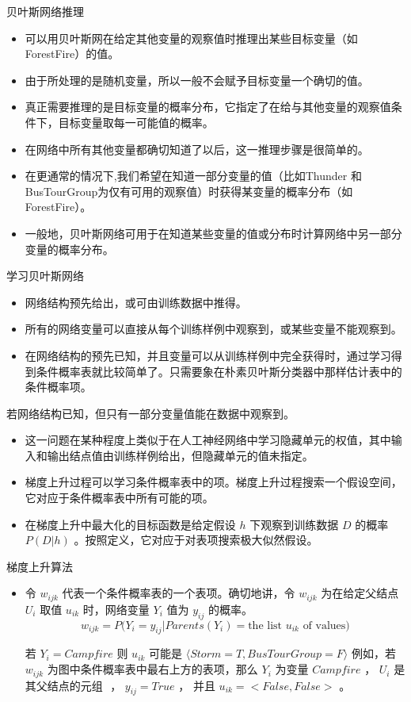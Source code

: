 \documentclass[presentation]{beamer}
\begin{document}
\begin{frame}[label={sec:orgf4b8337}]{贝叶斯网络推理}
\begin{itemize}
\item 可以用贝叶斯网在给定其他变量的观察值时推理出某些目标变量（如ForestFire）的值。
\item 由于所处理的是随机变量，所以一般不会赋予目标变量一个确切的值。
\item 真正需要推理的是目标变量的概率分布，它指定了在给与其他变量的观察值条件下，目标变量取每一可能值的概率。
\item 在网络中所有其他变量都确切知道了以后，这一推理步骤是很简单的。
\item 在更通常的情况下,我们希望在知道一部分变量的值（比如Thunder 和BusTourGroup为仅有可用的观察值）时获得某变量的概率分布（如ForestFire）。
\item 一般地，贝叶斯网络可用于在知道某些变量的值或分布时计算网络中另一部分变量的概率分布。
\end{itemize}
\end{frame}

\begin{frame}[label={sec:org0c68231}]{学习贝叶斯网络}
\begin{itemize}
\item 网络结构预先给出，或可由训练数据中推得。
\item 所有的网络变量可以直接从每个训练样例中观察到，或某些变量不能观察到。
\item 在网络结构的预先已知，并且变量可以从训练样例中完全获得时，通过学习得到条件概率表就比较简单了。只需要象在朴素贝叶斯分类器中那样估计表中的条件概率项。
\end{itemize}

若网络结构已知，但只有一部分变量值能在数据中观察到。
\begin{itemize}
\item 这一问题在某种程度上类似于在人工神经网络中学习隐藏单元的权值，其中输入和输出结点值由训练样例给出，但隐藏单元的值未指定。
\item 梯度上升过程可以学习条件概率表中的项。梯度上升过程搜索一个假设空间，它对应于条件概率表中所有可能的项。
\item 在梯度上升中最大化的目标函数是给定假设 \(h\) 下观察到训练数据 \(D\) 的概率 \(P(D|h)\) 。按照定义，它对应于对表项搜索极大似然假设。
\end{itemize}
\end{frame}

\begin{frame}[label={sec:org6c76063}]{梯度上升算法}
\begin{itemize}
\item 令 \(w_{ijk}\) 代表一个条件概率表的一个表项。确切地讲，令 \(w_{ijk}\)  为在给定父结点 \(U_i\) 取值 \(u_{ik}\) 时，网络变量 \(Y_i\) 值为 \(y_{ij}\) 的概率。
$$w_{ijk} = P(Y_i=y_{ij} | Parents(Y_i) = \mbox{the list $u_{ik}$ of values)}$$

若  \(Y_i = Campfire\) 则 \(u_{ik}\) 可能是 \(\langle Storm=T, BusTourGroup=F \rangle\)
例如，若 \(w_{ijk}\) 为图中条件概率表中最右上方的表项，那么 \(Y_i\) 为变量 \(Campfire\) ， 
\(U_i\) 是其父结点的元组 \(<Storm, BusTourGroup>\) ， \(y_{ij}=True\) ， 并且 \(u_{ik}=<False, False>\) 。
\end{itemize}
\end{frame}
\end{document}
